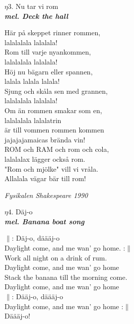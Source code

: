 \documentclass[a6paper,10pt]{article}
\newcommand{\mel}[1]{\small\textbf{\textit{mel. #1 \\}}}
\begin{document}
\setlength{\oddsidemargin}{-0.37in}
\noindent
\begin{center}
\Large $\eta3$. Nu tar vi rom \\
\mel{Deck the hall}
\end{center}
Här på skeppet rinner rommen,\\
lalalalala lalalala!\\
Rom till varje nyankommen,\\
lalalalala lalalala!\\
Höj nu bägarn eller spannen,\\
lalala lalala lalala!\\
Sjung och skåla sen med grannen,\\
lalalalala lalalala!
\vspace{5pt}\\
Om än rommen smakar som en,\\
lalalalala lalalatrin\\
är till vommen rommen kommen\\
jajajajamaicas brända vin!\\
ROM och RAM och rom och cola,\\
lalalalax lägger också rom.\\
"Rom och mjölke" vill vi vråla.\\
Allalala vägar bär till rom! 
\begin{flushright}
\textit{Fysikalen Shakespeare 1990}
\end{flushright}
\begin{center}
\Large $\eta4$. Däj-o \\
\mel{Banana boat song}
\end{center}
$\|$: Däj-o, däääj-o\\
Daylight come, and me wan' go home. :$\|$\\
Work all night on a drink of rum.\\
Daylight come, and me wan' go home\\
Stack the banana till the morning come.\\
Daylight come, and me wan' go home
\vspace{5pt}\\
$\|$: Dääj-o, däääj-o\\
Daylight come, and me wan' go home :$\|$\\
Däääj-o! 
\end{document}
